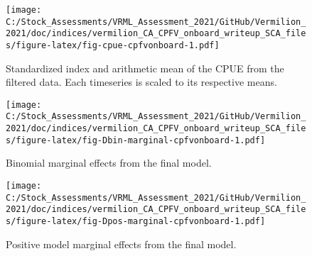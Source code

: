 \documentclass[
]{article}
\begin{document}
\begin{figure}
\centering
\texttt{[image: C:/Stock\_Assessments/VRML\_Assessment\_2021/GitHub/Vermilion\_2021/doc/indices/vermilion\_CA\_CPFV\_onboard\_writeup\_SCA\_files/figure-latex/fig-cpue-cpfvonboard-1.pdf]}
\caption{\label{fig:fig-cpue-cpfvonboard}Standardized index and arithmetic mean of the CPUE from the filtered data. Each timeseries is scaled to its respective means.}
\end{figure}

\begin{figure}
\centering
\texttt{[image: C:/Stock\_Assessments/VRML\_Assessment\_2021/GitHub/Vermilion\_2021/doc/indices/vermilion\_CA\_CPFV\_onboard\_writeup\_SCA\_files/figure-latex/fig-Dbin-marginal-cpfvonboard-1.pdf]}
\caption{\label{fig:fig-Dbin-marginal-cpfvonboard}Binomial marginal effects from the final model.}
\end{figure}

\begin{figure}
\centering
\texttt{[image: C:/Stock\_Assessments/VRML\_Assessment\_2021/GitHub/Vermilion\_2021/doc/indices/vermilion\_CA\_CPFV\_onboard\_writeup\_SCA\_files/figure-latex/fig-Dpos-marginal-cpfvonboard-1.pdf]}
\caption{\label{fig:fig-Dpos-marginal-cpfvonboard}Positive model marginal effects from the final model.}
\end{figure}
\end{document}
